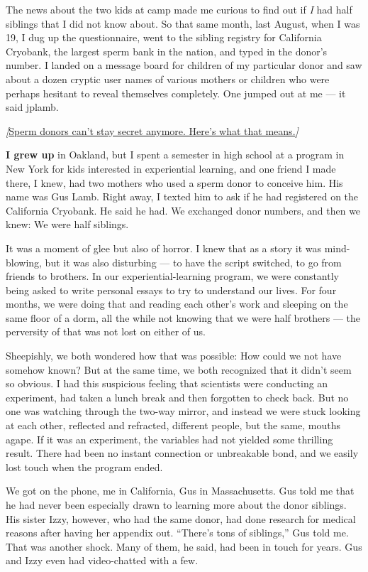 The news about the two kids at camp made me curious to find out if
\emph{I} had half siblings that I did not know about. So that same
month, last August, when I was 19, I dug up the questionnaire, went to
the sibling registry for California Cryobank, the largest sperm bank in
the nation, and typed in the donor's number. I landed on a message board
for children of my particular donor and saw about a dozen cryptic user
names of various mothers or children who were perhaps hesitant to reveal
themselves completely. One jumped out at me --- it said jplamb.

\emph{{[}}\href{https://www.nytimes3xbfgragh.onion/2019/06/26/magazine/sperm-donor-questions.html}{Sperm
donors can't stay secret anymore. Here's what that means.}\emph{{]}}

\textbf{I grew up} in Oakland, but I spent a semester in high school at
a program in New York for kids interested in experiential learning, and
one friend I made there, I knew, had two mothers who used a sperm donor
to conceive him. His name was Gus Lamb. Right away, I texted him to ask
if he had registered on the California Cryobank. He said he had. We
exchanged donor numbers, and then we knew: We were half siblings.

It was a moment of glee but also of horror. I knew that as a story it
was mind-blowing, but it was also disturbing --- to have the script
switched, to go from friends to brothers. In our experiential-learning
program, we were constantly being asked to write personal essays to try
to understand our lives. For four months, we were doing that and reading
each other's work and sleeping on the same floor of a dorm, all the
while not knowing that we were half brothers --- the perversity of that
was not lost on either of us.

Sheepishly, we both wondered how that was possible: How could we not
have somehow known? But at the same time, we both recognized that it
didn't seem so obvious. I had this suspicious feeling that scientists
were conducting an experiment, had taken a lunch break and then
forgotten to check back. But no one was watching through the two-way
mirror, and instead we were stuck looking at each other, reflected and
refracted, different people, but the same, mouths agape. If it was an
experiment, the variables had not yielded some thrilling result. There
had been no instant connection or unbreakable bond, and we easily lost
touch when the program ended.

We got on the phone, me in California, Gus in Massachusetts. Gus told me
that he had never been especially drawn to learning more about the donor
siblings. His sister Izzy, however, who had the same donor, had done
research for medical reasons after having her appendix out. ``There's
tons of siblings,'' Gus told me. That was another shock. Many of them,
he said, had been in touch for years. Gus and Izzy even had
video-chatted with a few.

